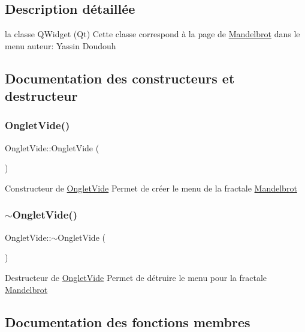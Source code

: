 \subsection{Description détaillée}
la classe Q\+Widget (Qt) Cette classe correspond à la page de \hyperlink{classMandelbrot}{Mandelbrot} dans le menu auteur\+: Yassin Doudouh 

\subsection{Documentation des constructeurs et destructeur}
\mbox{\label{classOngletVide_a09afab8766973faa9c084cd06514c8de}} 
\subsubsection{\texorpdfstring{Onglet\+Vide()}{OngletVide()}}
{\footnotesize\ttfamily Onglet\+Vide\+::\+Onglet\+Vide (\begin{DoxyParamCaption}{ }\end{DoxyParamCaption})}

Constructeur de \hyperlink{classOngletVide}{Onglet\+Vide} Permet de créer le menu de la fractale \hyperlink{classMandelbrot}{Mandelbrot} \mbox{\label{classOngletVide_a94260df1af9c0290acee39ffef24572a}} 
\subsubsection{\texorpdfstring{$\sim$\+Onglet\+Vide()}{~OngletVide()}}
{\footnotesize\ttfamily Onglet\+Vide\+::$\sim$\+Onglet\+Vide (\begin{DoxyParamCaption}{ }\end{DoxyParamCaption})}

Destructeur de \hyperlink{classOngletVide}{Onglet\+Vide} Permet de détruire le menu pour la fractale \hyperlink{classMandelbrot}{Mandelbrot} 

\subsection{Documentation des fonctions membres}
\mbox{\label{classOngletVide_a59177a1d6c3bc02c6799bcbfd30b56c3}} 
